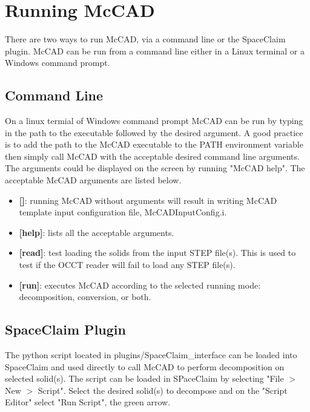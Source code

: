 \documentclass[letterpaper, 12 pt]{report}
\begin{document}
\section{Running McCAD} \label{sec:Running McCAD}
There are two ways to run McCAD, via a command line or the SpaceClaim plugin. McCAD can be run from a command line either in a Linux terminal or a Windows command prompt.

  \subsection{Command Line}
    On a linux termial of Windows command prompt McCAD can be run by typing in the path to the executable followed by the desired argument. A good practice is to add the path to the McCAD executable to the PATH environment variable then simply call McCAD with the acceptable desired command line arguments. The arguments could be displayed on the screen by running "McCAD help". The acceptable McCAD arguments are listed below.
    \begin{itemize}
      \item \textbf{[]}: running McCAD without arguments will result in writing McCAD template input configuration file, McCADInputConfig.i.
      \item \textbf{[help]}: lists all the acceptable arguments.
      \item \textbf{[read]}: test loading the solids from the input STEP file(s). This is used to test if the OCCT reader will fail to load any STEP file(s).
      \item \textbf{[run]}: executes McCAD according to the selected running mode: decomposition, conversion, or both. 
    \end{itemize}

  \subsection{SpaceClaim Plugin}
    The python script located in plugins/SpaceClaim\_interface can be loaded into SpaceClaim and used directly to call McCAD to perform decomposition on selected solid(s).  The script can be loaded in SPaceClaim by selecting "File $>$ New $>$ Script". Select the desired solid(s) to decompose and on the "Script Editor" select "Run Script", the green arrow.
\end{document}
